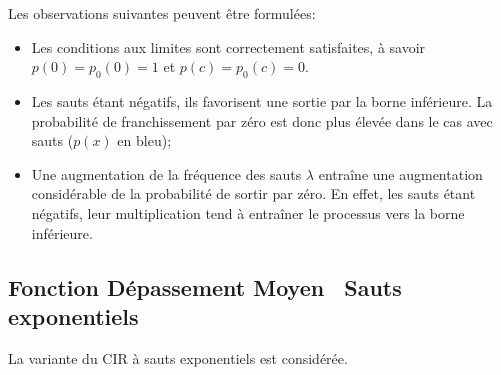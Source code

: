 Les observations suivantes peuvent être formulées:
\begin{itemize}
    \item Les conditions aux limites sont correctement satisfaites, à savoir \( p(0) = p_0(0) = 1 \) et \( p(c) = p_0(c) = 0 \).
    \item Les sauts étant négatifs, ils favorisent une sortie par la borne inférieure. La probabilité de franchissement par zéro est donc plus élevée dans le cas avec sauts ($p(x)$ en bleu);
    \item Une augmentation de la fréquence des sauts $\lambda$ entraîne une augmentation considérable de la probabilité de sortir par zéro. En effet, les sauts étant négatifs, leur multiplication tend à entraîner le processus vers la borne inférieure.
\end{itemize}

\subsection{Fonction Dépassement Moyen \textemdash~Sauts exponentiels}
La variante du \acs{CIR} à sauts exponentiels est considérée.
